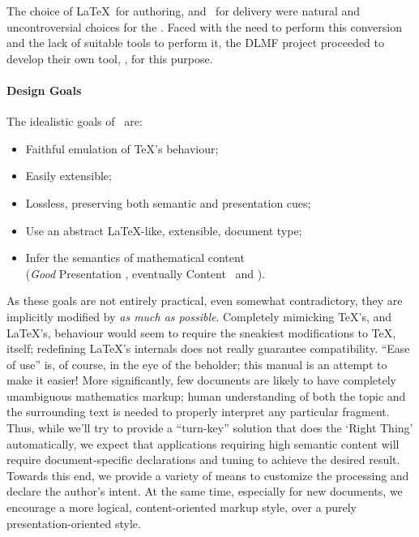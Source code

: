 \documentclass{book}
\begin{document}
The choice of \LaTeX\ for authoring, and \XML\ for delivery were natural and uncontroversial
choices for the .
Faced with the need to perform this conversion and the lack of suitable tools to perform it, 
the DLMF project proceeded to develop their own tool, \LaTeXML, for this purpose.

\paragraph{Design Goals} The idealistic goals of \LaTeXML\ are:
\begin{itemize}
\item Faithful emulation of \TeX's behaviour;
\item Easily extensible;
\item Lossless, preserving both semantic and presentation cues;
\item Use an abstract \LaTeX-like, extensible, document type;
\item Infer the semantics of mathematical content\\
    (\emph{Good} Presentation \MathML, eventually Content \MathML\ and \OpenMath).
\end{itemize}

As these goals are not entirely practical, even somewhat contradictory,
they are implicitly modified by \emph{as much as possible}.
Completely mimicking \TeX's, and \LaTeX's, behaviour would seem to require the
sneakiest modifications to \TeX, itself; redefining \LaTeX's internals does 
not really guarantee compatibility. ``Ease of use'' is, of course, in the eye of the beholder;
this manual is an attempt to make it easier!
More significantly, few documents are likely to have completely unambiguous
mathematics markup; human understanding of both the topic and the surrounding 
text is needed to properly interpret any particular fragment.
Thus, while we'll try to provide a ``turn-key'' solution that does the `Right Thing'
automatically, we expect that applications requiring high semantic content will require
document-specific declarations and tuning to achieve the desired result.
Towards this end, we provide a variety
of means to customize the processing and declare the author's intent.
At the same time, especially for new documents, we encourage a more logical, 
content-oriented markup style, over a purely presentation-oriented style.
\end{document}
